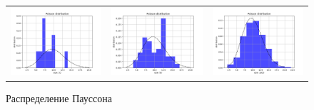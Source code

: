 \documentclass[../main.tex]{subfiles}
\begin{document}
	\begin{figure}[H]
		\centering
		\begin{tabular}{ccc}
			\includegraphics[width=55mm, height =0.25\textheight]{figures/poisson_10.png} 
			&
			\includegraphics[width=55mm, height =0.25\textheight]{figures/poisson_50.png}
			&
			\includegraphics[width=55mm, height =0.25\textheight]{figures/poisson_1000.png}
		\end{tabular}
		\caption{Распределение Пауссона} 
		\label{fig:normal}
	\end{figure}
	
\end{document}
